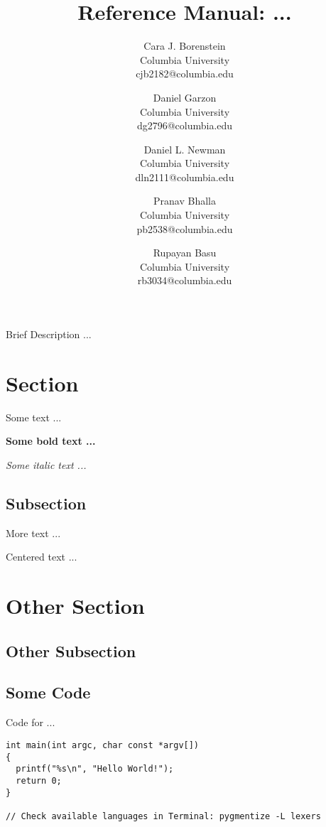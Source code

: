 \documentclass{article}
\title{\textbf{\huge Reference Manual: ...}}
\author{
  Cara J. Borenstein\\
  Columbia University\\
  cjb2182@columbia.edu
  \and
  Daniel Garzon\\
  Columbia University\\
  dg2796@columbia.edu
  \and
  Daniel L. Newman\\
  Columbia University\\
  dln2111@columbia.edu
  \and
  Pranav Bhalla\\
  Columbia University\\
  pb2538@columbia.edu
  \and
  Rupayan Basu\\
  Columbia University\\
  rb3034@columbia.edu
}
\date{}
\begin{document}
\maketitle

Brief Description ...

\section{Section}

Some text  ...

\textbf{Some bold text  ...}

\emph{Some italic text  ...}

\subsection{Subsection}

More text  ...

\centerline{Centered text ...}
\vspace{0.4em}

\section{Other Section}
\subsection{Other Subsection}


\subsection{Some Code}
\vspace{-1em}
\begin{listing}[H]
  \caption{Code for ...}
  \begin{verbatim}
int main(int argc, char const *argv[])
{
  printf("%s\n", "Hello World!");
  return 0;
}

// Check available languages in Terminal: pygmentize -L lexers
  \end{verbatim}

  \label{lst:the-code}
\end{listing}

\end{document}
